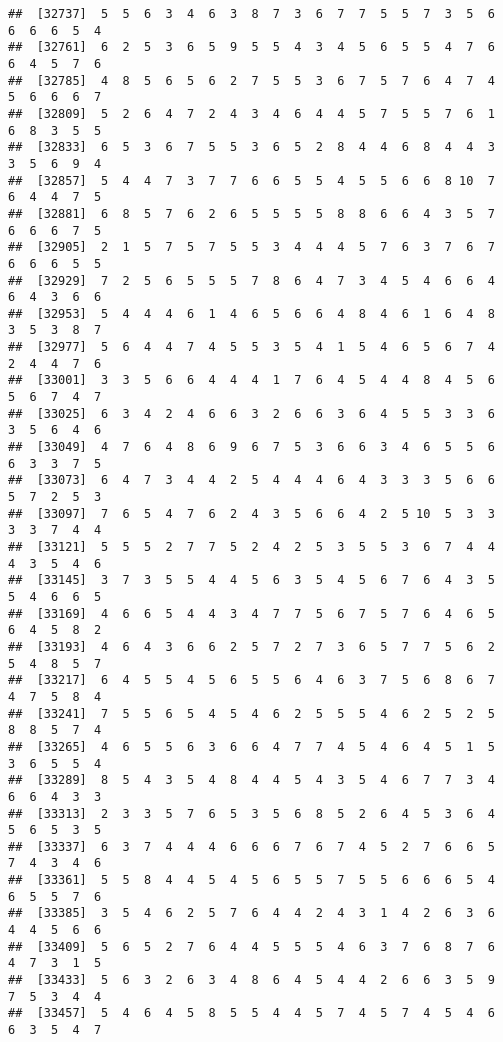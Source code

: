 \documentclass[
]{book}
\begin{document}
\begin{verbatim}
##  [32737]  5  5  6  3  4  6  3  8  7  3  6  7  7  5  5  7  3  5  6  6  6  6  5  4
##  [32761]  6  2  5  3  6  5  9  5  5  4  3  4  5  6  5  5  4  7  6  6  4  5  7  6
##  [32785]  4  8  5  6  5  6  2  7  5  5  3  6  7  5  7  6  4  7  4  5  6  6  6  7
##  [32809]  5  2  6  4  7  2  4  3  4  6  4  4  5  7  5  5  7  6  1  6  8  3  5  5
##  [32833]  6  5  3  6  7  5  5  3  6  5  2  8  4  4  6  8  4  4  3  3  5  6  9  4
##  [32857]  5  4  4  7  3  7  7  6  6  5  5  4  5  5  6  6  8 10  7  6  4  4  7  5
##  [32881]  6  8  5  7  6  2  6  5  5  5  5  8  8  6  6  4  3  5  7  6  6  6  7  5
##  [32905]  2  1  5  7  5  7  5  5  3  4  4  4  5  7  6  3  7  6  7  6  6  6  5  5
##  [32929]  7  2  5  6  5  5  5  7  8  6  4  7  3  4  5  4  6  6  4  6  4  3  6  6
##  [32953]  5  4  4  4  6  1  4  6  5  6  6  4  8  4  6  1  6  4  8  3  5  3  8  7
##  [32977]  5  6  4  4  7  4  5  5  3  5  4  1  5  4  6  5  6  7  4  2  4  4  7  6
##  [33001]  3  3  5  6  6  4  4  4  1  7  6  4  5  4  4  8  4  5  6  5  6  7  4  7
##  [33025]  6  3  4  2  4  6  6  3  2  6  6  3  6  4  5  5  3  3  6  3  5  6  4  6
##  [33049]  4  7  6  4  8  6  9  6  7  5  3  6  6  3  4  6  5  5  6  6  3  3  7  5
##  [33073]  6  4  7  3  4  4  2  5  4  4  4  6  4  3  3  3  5  6  6  5  7  2  5  3
##  [33097]  7  6  5  4  7  6  2  4  3  5  6  6  4  2  5 10  5  3  3  3  3  7  4  4
##  [33121]  5  5  5  2  7  7  5  2  4  2  5  3  5  5  3  6  7  4  4  4  3  5  4  6
##  [33145]  3  7  3  5  5  4  4  5  6  3  5  4  5  6  7  6  4  3  5  5  4  6  6  5
##  [33169]  4  6  6  5  4  4  3  4  7  7  5  6  7  5  7  6  4  6  5  6  4  5  8  2
##  [33193]  4  6  4  3  6  6  2  5  7  2  7  3  6  5  7  7  5  6  2  5  4  8  5  7
##  [33217]  6  4  5  5  4  5  6  5  5  6  4  6  3  7  5  6  8  6  7  4  7  5  8  4
##  [33241]  7  5  5  6  5  4  5  4  6  2  5  5  5  4  6  2  5  2  5  8  8  5  7  4
##  [33265]  4  6  5  5  6  3  6  6  4  7  7  4  5  4  6  4  5  1  5  3  6  5  5  4
##  [33289]  8  5  4  3  5  4  8  4  4  5  4  3  5  4  6  7  7  3  4  6  6  4  3  3
##  [33313]  2  3  3  5  7  6  5  3  5  6  8  5  2  6  4  5  3  6  4  5  6  5  3  5
##  [33337]  6  3  7  4  4  4  6  6  6  7  6  7  4  5  2  7  6  6  5  7  4  3  4  6
##  [33361]  5  5  8  4  4  5  4  5  6  5  5  7  5  5  6  6  6  5  4  6  5  5  7  6
##  [33385]  3  5  4  6  2  5  7  6  4  4  2  4  3  1  4  2  6  3  6  4  4  5  6  6
##  [33409]  5  6  5  2  7  6  4  4  5  5  5  4  6  3  7  6  8  7  6  4  7  3  1  5
##  [33433]  5  6  3  2  6  3  4  8  6  4  5  4  4  2  6  6  3  5  9  7  5  3  4  4
##  [33457]  5  4  6  4  5  8  5  5  4  4  5  7  4  5  7  4  5  4  6  6  3  5  4  7

\end{verbatim}
\end{document}
